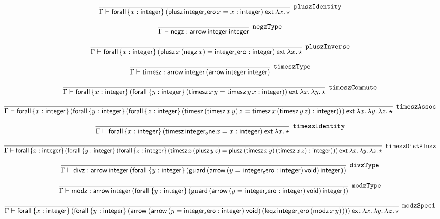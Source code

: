 \[
\infer[{\tt pluszIdentity}]{\Gamma \vdash {\sf forall}\,\{x : {\sf integer}\}\,({\sf plusz}\,{\sf integer_zero}\,x= x: {\sf integer})\:{\sf ext}\:\lambda x.\,\star }{}
\]

\[
\infer[{\tt negzType}]{\Gamma \vdash {\sf negz}: {\sf arrow}\,{\sf integer}\,{\sf integer}}{}
\]

\[
\infer[{\tt pluszInverse}]{\Gamma \vdash {\sf forall}\,\{x : {\sf integer}\}\,({\sf plusz}\,x\,({\sf negz}\,x)= {\sf integer_zero}: {\sf integer})\:{\sf ext}\:\lambda x.\,\star }{}
\]

\[
\infer[{\tt timeszType}]{\Gamma \vdash {\sf timesz}: {\sf arrow}\,{\sf integer}\,({\sf arrow}\,{\sf integer}\,{\sf integer})}{}
\]

\[
\infer[{\tt timeszCommute}]{\Gamma \vdash {\sf forall}\,\{x : {\sf integer}\}\,({\sf forall}\,\{y : {\sf integer}\}\,({\sf timesz}\,x\,y= {\sf timesz}\,y\,x: {\sf integer}))\:{\sf ext}\:\lambda x.\,\lambda y.\,\star }{}
\]

\[
\infer[{\tt timeszAssoc}]{\Gamma \vdash {\sf forall}\,\{x : {\sf integer}\}\,({\sf forall}\,\{y : {\sf integer}\}\,({\sf forall}\,\{z : {\sf integer}\}\,({\sf timesz}\,({\sf timesz}\,x\,y)\,z= {\sf timesz}\,x\,({\sf timesz}\,y\,z): {\sf integer})))\:{\sf ext}\:\lambda x.\,\lambda y.\,\lambda z.\,\star }{}
\]

\[
\infer[{\tt timeszIdentity}]{\Gamma \vdash {\sf forall}\,\{x : {\sf integer}\}\,({\sf timesz}\,{\sf integer_one}\,x= x: {\sf integer})\:{\sf ext}\:\lambda x.\,\star }{}
\]

\[
\infer[{\tt timeszDistPlusz}]{\Gamma \vdash {\sf forall}\,\{x : {\sf integer}\}\,({\sf forall}\,\{y : {\sf integer}\}\,({\sf forall}\,\{z : {\sf integer}\}\,({\sf timesz}\,x\,({\sf plusz}\,y\,z)= {\sf plusz}\,({\sf timesz}\,x\,y)\,({\sf timesz}\,x\,z): {\sf integer})))\:{\sf ext}\:\lambda x.\,\lambda y.\,\lambda z.\,\star }{}
\]

\[
\infer[{\tt divzType}]{\Gamma \vdash {\sf divz}: {\sf arrow}\,{\sf integer}\,({\sf forall}\,\{y : {\sf integer}\}\,({\sf guard}\,({\sf arrow}\,(y= {\sf integer_zero}: {\sf integer})\,{\sf void})\,{\sf integer}))}{}
\]

\[
\infer[{\tt modzType}]{\Gamma \vdash {\sf modz}: {\sf arrow}\,{\sf integer}\,({\sf forall}\,\{y : {\sf integer}\}\,({\sf guard}\,({\sf arrow}\,(y= {\sf integer_zero}: {\sf integer})\,{\sf void})\,{\sf integer}))}{}
\]

\[
\infer[{\tt modzSpec1}]{\Gamma \vdash {\sf forall}\,\{x : {\sf integer}\}\,({\sf forall}\,\{y : {\sf integer}\}\,({\sf arrow}\,({\sf arrow}\,(y= {\sf integer_zero}: {\sf integer})\,{\sf void})\,({\sf leqz}\,{\sf integer_zero}\,({\sf modz}\,x\,y))))\:{\sf ext}\:\lambda x.\,\lambda y.\,\lambda z.\,\star }{}
\]

